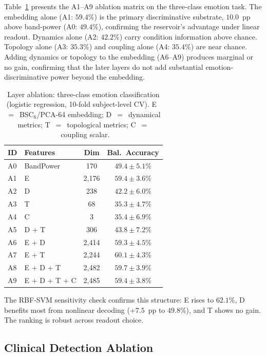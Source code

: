 Table~\ref{tab:emotion_ablation} presents the A1--A9 ablation matrix on the three-class emotion task. The embedding alone (A1: $59.4\%$) is the primary discriminative substrate, $10.0$~pp above band-power (A0: $49.4\%$), confirming the reservoir's advantage under linear readout. Dynamics alone (A2: $42.2\%$) carry condition information above chance. Topology alone (A3: $35.3\%$) and coupling alone (A4: $35.4\%$) are near chance. Adding dynamics or topology to the embedding (A6--A9) produces marginal or no gain, confirming that the later layers do not add substantial emotion-discriminative power beyond the embedding.

\begin{table}[t]
\centering
\caption{Layer ablation: three-class emotion classification (logistic regression, 10-fold subject-level CV). E~$=$~BSC$_6$/PCA-64 embedding; D~$=$~dynamical metrics; T~$=$~topological metrics; C~$=$~coupling scalar.}
\label{tab:emotion_ablation}
\small
\begin{tabular}{llcc}
\hline
\textbf{ID} & \textbf{Features} & \textbf{Dim} & \textbf{Bal.\ Accuracy} \\
\hline
A0 & BandPower & 170 & $49.4 \pm 5.1\%$ \\
A1 & E & 2,176 & $59.4 \pm 3.6\%$ \\
A2 & D & 238 & $42.2 \pm 6.0\%$ \\
A3 & T & 68 & $35.3 \pm 4.7\%$ \\
A4 & C & 3 & $35.4 \pm 6.9\%$ \\
A5 & D + T & 306 & $43.8 \pm 7.2\%$ \\
A6 & E + D & 2,414 & $59.3 \pm 4.5\%$ \\
A7 & E + T & 2,244 & $60.1 \pm 4.3\%$ \\
A8 & E + D + T & 2,482 & $59.7 \pm 3.9\%$ \\
A9 & E + D + T + C & 2,485 & $59.4 \pm 3.8\%$ \\
\hline
\end{tabular}
\end{table}

The RBF-SVM sensitivity check confirms this structure: E rises to $62.1\%$, D benefits most from nonlinear decoding ($+7.5$~pp to $49.8\%$), and T shows no gain. The ranking is robust across readout choice.

\subsection{Clinical Detection Ablation}

